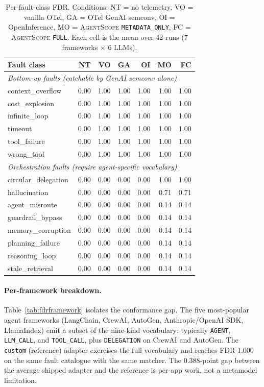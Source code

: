 \documentclass[sigplan,10pt,anonymous,review]{acmart}
\newcommand{\sysname}{\textsc{AgentScope}\xspace}
\begin{document}
\begin{table}[t]
\centering
\small
\caption{Per-fault-class FDR. Conditions: NT = no telemetry,
VO = vanilla OTel, GA = OTel GenAI semconv, OI = OpenInference,
MO = \sysname{} \texttt{METADATA\_ONLY}, FC = \sysname{}
\texttt{FULL}. Each cell is the mean over 42 runs (7 frameworks
$\times$ 6 LLMs).}
\label{tab:fdrmatrix}
\begin{tabular}{@{}lrrrrrr@{}}
\toprule
\textbf{Fault class} & \textbf{NT} & \textbf{VO} & \textbf{GA} & \textbf{OI} & \textbf{MO} & \textbf{FC} \\
\midrule
\multicolumn{7}{l}{\emph{Bottom-up faults (catchable by GenAI semconv alone)}}\\
context\_overflow    & 0.00 & 1.00 & 1.00 & 1.00 & 1.00 & 1.00 \\
cost\_explosion      & 0.00 & 1.00 & 1.00 & 1.00 & 1.00 & 1.00 \\
infinite\_loop       & 0.00 & 1.00 & 1.00 & 1.00 & 1.00 & 1.00 \\
timeout              & 0.00 & 1.00 & 1.00 & 1.00 & 1.00 & 1.00 \\
tool\_failure        & 0.00 & 1.00 & 1.00 & 1.00 & 1.00 & 1.00 \\
wrong\_tool          & 0.00 & 1.00 & 1.00 & 1.00 & 1.00 & 1.00 \\
\midrule
\multicolumn{7}{l}{\emph{Orchestration faults (require agent-specific vocabulary)}}\\
circular\_delegation & 0.00 & 0.00 & 0.00 & 0.00 & 1.00 & 1.00 \\
hallucination        & 0.00 & 0.00 & 0.00 & 0.00 & 0.71 & 0.71 \\
agent\_misroute      & 0.00 & 0.00 & 0.00 & 0.00 & 0.14 & 0.14 \\
guardrail\_bypass    & 0.00 & 0.00 & 0.00 & 0.00 & 0.14 & 0.14 \\
memory\_corruption   & 0.00 & 0.00 & 0.00 & 0.00 & 0.14 & 0.14 \\
planning\_failure    & 0.00 & 0.00 & 0.00 & 0.00 & 0.14 & 0.14 \\
reasoning\_loop      & 0.00 & 0.00 & 0.00 & 0.00 & 0.14 & 0.14 \\
stale\_retrieval     & 0.00 & 0.00 & 0.00 & 0.00 & 0.14 & 0.14 \\
\bottomrule
\end{tabular}
\end{table}

\paragraph{Per-framework breakdown.} Table~\ref{tab:fdrframework}
isolates the conformance gap. The five most-popular agent frameworks
(LangChain, CrewAI, AutoGen, Anthropic/OpenAI SDK, LlamaIndex) emit a
subset of the nine-kind vocabulary: typically \texttt{AGENT},
\texttt{LLM\_CALL}, and \texttt{TOOL\_CALL}, plus
\texttt{DELEGATION} on CrewAI and AutoGen. The \texttt{custom}
(reference) adapter exercises the full vocabulary and reaches FDR
1.000 on the same fault catalogue with the same matcher. The 0.388-point
gap between the average shipped adapter and the reference is per-app
work, not a metamodel limitation.
\end{document}
